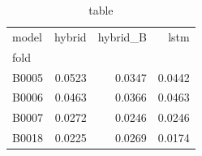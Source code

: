 \begin{table}
\caption{table}
\label{tab:table}
\begin{tabular}{lrrr}
\toprule
model & hybrid & hybrid\_B & lstm \\
fold &  &  &  \\
\midrule
B0005 & 0.0523 & 0.0347 & 0.0442 \\
B0006 & 0.0463 & 0.0366 & 0.0463 \\
B0007 & 0.0272 & 0.0246 & 0.0246 \\
B0018 & 0.0225 & 0.0269 & 0.0174 \\
\bottomrule
\end{tabular}
\end{table}
